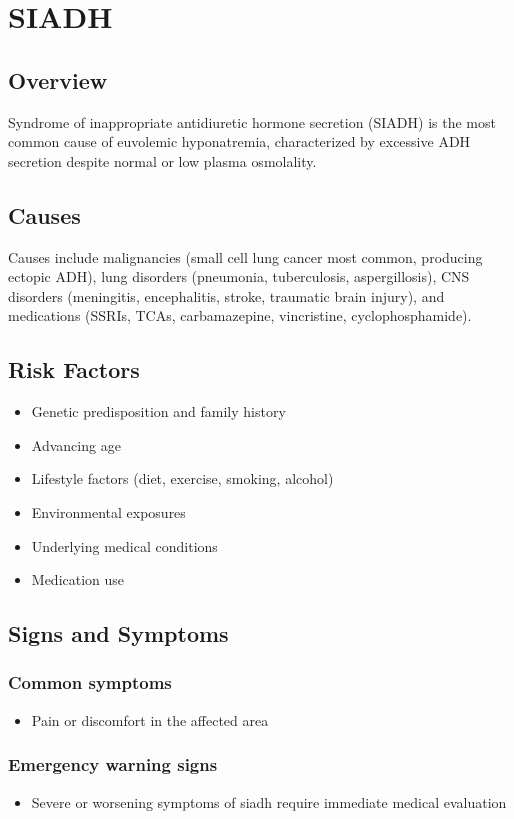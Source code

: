\chapter{SIADH}
\label{sec:SIADH}

\section{Overview}
Syndrome of inappropriate antidiuretic hormone secretion (SIADH) is the most common cause of euvolemic hyponatremia, characterized by excessive ADH secretion despite normal or low plasma osmolality.
\section{Causes}
Causes include malignancies (small cell lung cancer most common, producing ectopic ADH), lung disorders (pneumonia, tuberculosis, aspergillosis), CNS disorders (meningitis, encephalitis, stroke, traumatic brain injury), and medications (SSRIs, TCAs, carbamazepine, vincristine, cyclophosphamide).     
\section{Risk Factors}

\begin{itemize}[noitemsep]
  \item Genetic predisposition and family history
  \item Advancing age
  \item Lifestyle factors (diet, exercise, smoking, alcohol)
  \item Environmental exposures
  \item Underlying medical conditions
  \item Medication use
\end{itemize}
\section{Signs and Symptoms}

\subsection{Common symptoms}
\begin{itemize}[noitemsep]
  \item Pain or discomfort in the affected area
  \end{itemize}

\subsection{Emergency warning signs}
\begin{itemize}[noitemsep]
  \item Severe or worsening symptoms of siadh require immediate medical evaluation
\end{itemize}
